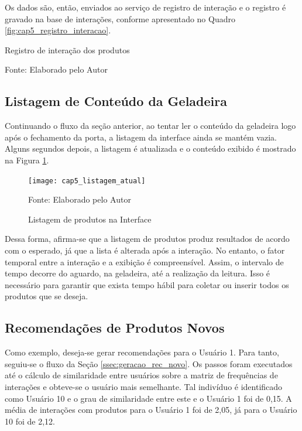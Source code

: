  Os dados são, então, enviados ao serviço de registro de interação e o registro é gravado na base de interações, conforme apresentado no Quadro \ref{fig:cap5_registro_interacao}. 
 
 \begin{quadro}[htb]
     \caption{Registro de interação dos produtos}
     \label{fig:cap5_registro_interacao}
     
     
     \footnotesize{Fonte: Elaborado pelo Autor}
 \end{quadro}
 
\subsection{Listagem de Conteúdo da Geladeira}
 
Continuando o fluxo da seção anterior, ao tentar ler o conteúdo da geladeira logo após o fechamento da porta, a listagem da interface ainda se mantém vazia. Alguns segundos depois, a listagem é atualizada e o conteúdo exibido é mostrado na Figura \ref{fig:cap5_listagem_atual}.


\begin{figure}[htb]
    \caption{Listagem de produtos na Interface}
    \label{fig:cap5_listagem_atual}
    \texttt{[image: cap5\_listagem\_atual]}
    
    \footnotesize{Fonte: Elaborado pelo Autor}
\end{figure}
 
Dessa forma, afirma-se que a listagem de produtos produz resultados de acordo com o esperado, já que a lista é alterada após a interação. No entanto, o fator temporal entre a interação e a exibição é compreensível. Assim, o intervalo de tempo decorre do aguardo, na geladeira, até a realização da leitura. Isso é necessário para garantir que exista tempo hábil para coletar ou inserir todos os produtos que se deseja.


\subsection{Recomendações de Produtos Novos}

Como exemplo, deseja-se gerar recomendações para o Usuário 1. Para tanto, seguiu-se o fluxo da Seção \ref{ssec:geracao_rec_novo}. Os passos foram executados até o cálculo de similaridade entre usuários sobre a matriz de frequências de interações e obteve-se o usuário mais semelhante. Tal indivíduo é identificado como Usuário 10 e o grau de similaridade entre este e o Usuário 1 foi de 0,15. A média de interações com produtos para o Usuário 1 foi de 2,05, já para o Usuário 10 foi de 2,12.

